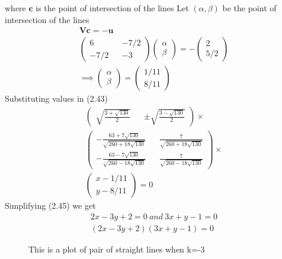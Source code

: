 \documentclass[journal,13pt,twocolumn]{IEEEtran}
\newcommand{\myvec}[1]{\ensuremath{\begin{pmatrix}#1\end{pmatrix}}}
\renewcommand{\vec}[1]{\mathbf{#1}}
\begin{document}
where $\vec{c}$ is the point of intersection of the lines 
Let $(\alpha,\beta)$ be the point of intersection of the lines 
\begin{equation}
\begin{split}
\vec{V}\vec{c} = -\vec{u}\\
\myvec{6 && -7/2\\-7/2 && -3} \myvec{\alpha \\ \beta} = -\myvec{2 \\ 5/2}\\
\implies \myvec{\alpha \\ \beta} = \myvec{1/11 \\ 8/11}
\end{split}
\end{equation}
Substituting values in (2.43)
\begin{equation}
\begin{split}
\myvec{ \sqrt{\frac{3+\sqrt{130}}{2}} && \pm\sqrt{\frac{3-\sqrt{130}}{2}}} \times \\
\myvec{ -\frac{63+7\sqrt{130}}{\sqrt{260+18\sqrt{130}}} && \frac{7}{\sqrt{260+18\sqrt{130}}} \\ -\frac{63-7\sqrt{130}}{\sqrt{260-18\sqrt{130}}} && \frac{7}{\sqrt{260-18\sqrt{130}}}} \times \\
\myvec{x-1/11 \\ y-8/11} = 0
\end{split}
\end{equation}
Simplifying (2.45) we get 
\begin{equation}
\begin{split}
2x - 3y + 2 = 0~ and ~3x + y - 1 = 0\\
\boxed{(2x - 3y + 2)(3x + y - 1) = 0}
\end{split}
\end{equation}
\begin{figure}
   \centering
   \caption{This is a plot of pair of straight lines when k=-3}
   \end{figure}
\end{document}
